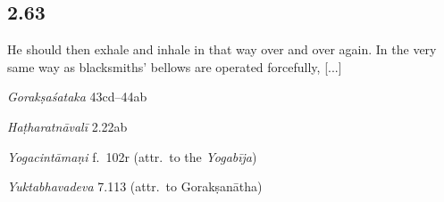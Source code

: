 \begin{ekdosis}
\subsection*{2.63}
\begin{translation}[hp02_063]
He should then exhale and inhale in that way over and over again. In the very same way as blacksmiths’ bellows are operated forcefully, [...]
\end{translation}

\begin{sources}[hp02_063]
\emph{Gorakṣaśataka} 43cd–44ab

\begin{versinnote}
\end{versinnote}
\end{sources}

\begin{testimonia}[hp02_063]
\emph{Haṭharatnāvalī} 2.22ab

\begin{versinnote}
\tl{\var{bhastrī ] bhastrā n4}\\!}
\end{versinnote} 

\emph{Yogacintāmaṇi} f.~102r (attr.~to the \emph{Yogabīja})

\begin{versinnote}
\end{versinnote}


\emph{Yuktabhavadeva} 7.113 (attr.~to Gorakṣanātha)

\begin{versinnote}
\end{versinnote}
\end{testimonia}



\end{ekdosis}
